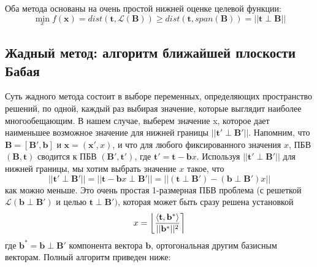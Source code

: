 Оба метода основаны на очень простой нижней оценке целевой функции:
$$ \min \limits_{x}f(\mathbf{x}) = dist\left(\mathbf{t}, \mathcal{L}\left(\mathbf{B}\right)\right)\geq dist \left(\mathbf{t}, span\left(\mathbf{B}\right)\right) = ||\mathbf{t} \perp \mathbf{B} || $$

\subsection{Жадный метод: алгоритм ближайшей плоскости Бабая}

Суть жадного метода состоит в выборе переменных, определяющих пространство решений, по одной, каждый раз выбирая значение, которые выглядит наиболее многообещающим. В нашем случае, выберем значение x, которое дает наименьшее возможное значение для нижней границы $ ||\mathbf{t}' \perp \mathbf{B}' || $. Напомним, что $ \mathbf{B}=\left[\mathbf{B}', \mathbf{b}\right] $ и $ \mathbf{x}=\left(\mathbf{x}' ,x\right) $, и что для любого фиксированного значения $ x $, ПБВ $ (\mathbf{B}, \mathbf{t}) $ сводится к ПБВ $ (\mathbf{B}',\mathbf{t}') $, где $ \mathbf{t}'=\mathbf{t}-\mathbf{b}x $. Используя $ ||\mathbf{t}' \perp \mathbf{B}' || $ для нижней границы, мы хотим выбрать значение $ x $ такое, что 
$$ || \mathbf{t}' \perp \mathbf{B}' || = || \mathbf{t} - \mathbf{b}x \perp \mathbf{B}' || = || (\mathbf{t} \perp \mathbf{B}') - (\mathbf{b} \perp \mathbf{B}')x || $$ 
как можно меньше. Это очень простая 1-размерная ПБВ проблема (с решеткой $ \mathcal{L}\left(\mathbf{b} \perp \mathbf{B}'\right) $ и целью $ \mathbf{t} \perp \mathbf{B}') $, которая может быть сразу решена установкой
$$ x = \left\lfloor \left\langle \mathbf{t},\mathbf{b}^* \right\rangle \over ||\mathbf{b}^*||^2 \right\rceil $$
где $ \mathbf{b}^* = \mathbf{b} \perp \mathbf{B}' $ компонента вектора $ \mathbf{b} $, ортогональная другим базисным векторам. Полный алгоритм приведен ниже: \newline





